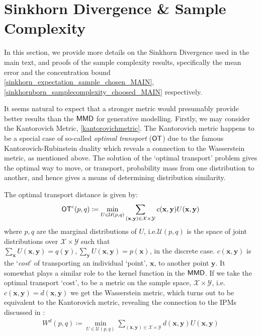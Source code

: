 

\section{Sinkhorn Divergence \& Sample Complexity \label{supp_matt:sinkhorn}}
In this section, we provide more details on the Sinkhorn Divergence used in the main text, and proofs of the sample complexity results, specifically the mean error and the concentration bound \eqref{sinkhorn_expectation_sample_chosen_MAIN}, 
\eqref{sinkhornborn_samplecomplexity_choosed_MAIN} respectively.

It seems natural to expect that a stronger metric would presumably provide better results than the $\operatorname{\textsf{MMD}}$ for generative modelling. Firstly, we may consider the Kantorovich Metric, \eqref{kantorovichmetric}. The Kantorovich metric happens to be a special case of so-called \textit{optimal transport} ($\operatorname{\textsf{OT}}$) due to the famous  Kantorovich-Rubinstein duality which reveals a connection to the Wasserstein metric, as mentioned above. The solution of the `optimal transport' problem gives the optimal way to move, or transport, probability mass from one distribution to another, and hence gives a means of determining distribution similarity. 

The optimal transport distance is given by:
\begin{align}
\operatorname{\textsf{OT}}^c(p, q)  \coloneqq \min\limits_{U \in \mathcal{U}(p, q)}\sum\limits_{(\mathbf{x}, \mathbf{y}) \in \mathcal{X}\times\mathcal{Y}} c(\mathbf{x}, \mathbf{y}) U(\mathbf{x}, \mathbf{y}) \label{otdistance_supp}
\end{align}
where $p, q$ are the marginal distributions of $U$, i.e.\@\@ $\mathcal{U}(p, q)$ is the space of joint distributions over $\mathcal{X}\times\mathcal{Y}$ such that $\sum_{\mathbf{x}}U(\mathbf{x}, \mathbf{y}) = q(\mathbf{y}), \sum_{\mathbf{y}}U(\mathbf{x}, \mathbf{y}) = p(\mathbf{x})$, in the discrete case. $c(\mathbf{x}, \mathbf{y})$ is the `\textit{cost}' of transporting an individual `point', $\mathbf{x}$, to another point $\mathbf{y}$. It somewhat plays a similar role to the kernel function in the $\operatorname{\textsf{MMD}}$. If we take the optimal transport `cost', to be a metric on the sample space, $\mathcal{X}\times \mathcal{Y}$, i.e.\@ $c(\mathbf{x}, \mathbf{y}) = d(\mathbf{x}, \mathbf{y})$ we get the Wasserstein metric, which turns out to be equivalent to  the Kantorovich metric, revealing the connection to the IPMs discussed in :
\begin{align}
W^d(p, q)  \coloneqq \min\limits_{U \in \mathcal{U}(p, q)}\sum\limits_{(\mathbf{x}, \mathbf{y}) \in \mathcal{X}\times \mathcal{Y}} d(\mathbf{x}, \mathbf{y}) U(\mathbf{x}, \mathbf{y}) \label{1wasserstein_supp}
\end{align}


